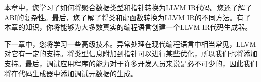 本章中，您学习了如何将聚合数据类型和指针转换为LLVM IR代码。您还了解了ABI的复杂性。最后，您了解了将类和虚函数转换为LLVM IR的不同方法。有了本章的知识，你将能够为大多数真实的编程语言创建一个LLVM IR代码生成器。\par

下一章中，您将学习一些高级技术。异常处理在现代编程语言中相当常见，LLVM对它有一定的支持。将类型信息附加到指针可以进行某些优化，所以我们也将添加支持。最后，调试应用程序的能力对于许多开发人员来说是必不可少的，因此我们将在代码生成器中添加调试元数据的生成。\par

\newpage